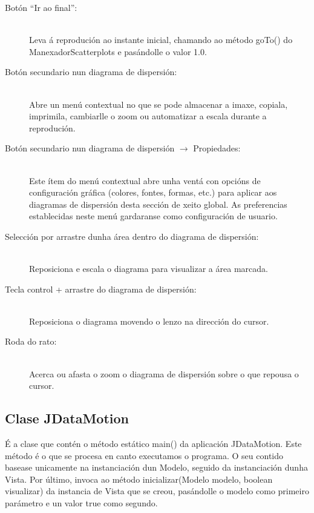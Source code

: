 \begin{description}
\begin{description}
\item[Botón ``Ir ao final'':] \hfill \\
Leva á reprodución ao instante inicial, chamando ao método goTo() do ManexadorScatterplots e pasándolle o valor 1.0.

\item[Botón secundario nun diagrama de dispersión:] \hfill \\
Abre un menú contextual no que se pode almacenar a imaxe, copiala, imprimila, cambiarlle o zoom ou automatizar a escala durante a reprodución.

\item[Botón secundario nun diagrama de dispersión $\rightarrow$ Propiedades:] \hfill \\
Este ítem do menú contextual abre unha ventá con opcións de configuración gráfica (colores, fontes, formas, etc.) para aplicar aos diagramas de dispersión desta sección de xeito global. As preferencias establecidas neste menú gardaranse como configuración de usuario.

\item[Selección por arrastre dunha área dentro do diagrama de dispersión:] \hfill \\
Reposiciona e escala o diagrama para visualizar a área marcada.

\item[Tecla control + arrastre do diagrama de dispersión:] \hfill \\
Reposiciona o diagrama movendo o lenzo na dirección do cursor.

\item[Roda do rato:] \hfill \\
Acerca ou afasta o zoom o diagrama de dispersión sobre o que repousa o cursor.

\end{description}

\end{description}

\subsection{Clase JDataMotion}

É a clase que contén o método estático main() da aplicación JDataMotion. Este método é o que se procesa en canto executamos o programa. O seu contido basease unicamente na instanciación dun Modelo, seguido da instanciación dunha Vista. Por último, invoca ao método inicializar(Modelo modelo, boolean visualizar) da instancia de Vista que se creou, pasándolle o modelo como primeiro parámetro e un valor true como segundo.

